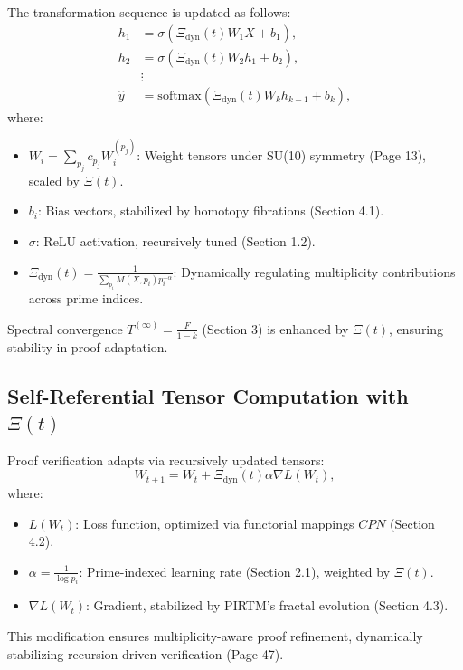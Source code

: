 \documentclass{article}
\theoremstyle{plain}
\begin{document}
\begin{itemize}
The transformation sequence is updated as follows:
\begin{align}
h_1 &= \sigma(\Xi_{\text{dyn}}(t) W_1 X + b_1), \\
h_2 &= \sigma(\Xi_{\text{dyn}}(t) W_2 h_1 + b_2), \\
&\vdots \\
\hat{y} &= \text{softmax}(\Xi_{\text{dyn}}(t) W_k h_{k-1} + b_k),
\end{align}
where:
\begin{itemize}
    \item \( W_i = \sum_{p_j} c_{p_j} W_i^{(p_j)} \): Weight tensors under SU(10) symmetry (Page 13), scaled by \(\Xi(t) \).
    \item \( b_i \): Bias vectors, stabilized by homotopy fibrations (Section 4.1).
    \item \( \sigma \): ReLU activation, recursively tuned (Section 1.2).
    \item \( \Xi_{\text{dyn}}(t) = \frac{1}{\sum_{p_i} M(X, p_i) p_i^{-\alpha}} \): Dynamically regulating multiplicity contributions across prime indices.
\end{itemize}
Spectral convergence \( T^{(\infty)} = \frac{F}{1 - k} \) (Section 3) is enhanced by \(\Xi(t) \), ensuring stability in proof adaptation.

\subsection{Self-Referential Tensor Computation with \(\Xi(t) \)}
Proof verification adapts via recursively updated tensors:
\begin{equation}
W_{t+1} = W_t + \Xi_{\text{dyn}}(t) \alpha \nabla L(W_t),
\end{equation}
where:
\begin{itemize}
    \item \( L(W_t) \): Loss function, optimized via functorial mappings \( CPN \) (Section 4.2).
    \item \( \alpha = \frac{1}{\log p_i} \): Prime-indexed learning rate (Section 2.1), weighted by \(\Xi(t) \).
    \item \( \nabla L(W_t) \): Gradient, stabilized by PIRTM’s fractal evolution (Section 4.3).
\end{itemize}
This modification ensures multiplicity-aware proof refinement, dynamically stabilizing recursion-driven verification (Page 47).


\end{itemize}
\end{document}

